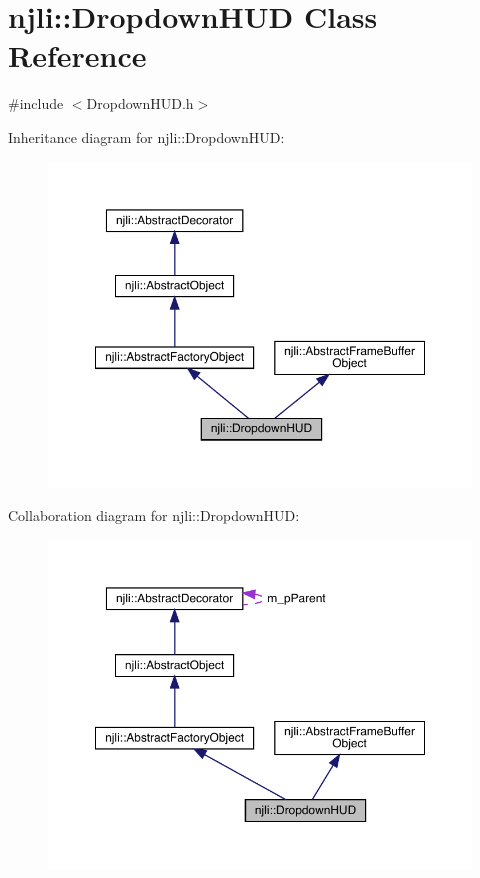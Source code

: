 \hypertarget{classnjli_1_1_dropdown_h_u_d}{}\section{njli\+:\+:Dropdown\+H\+UD Class Reference}
\label{classnjli_1_1_dropdown_h_u_d}


{\ttfamily \#include $<$Dropdown\+H\+U\+D.\+h$>$}



Inheritance diagram for njli\+:\+:Dropdown\+H\+UD\+:\nopagebreak
\begin{figure}[H]
\begin{center}
\leavevmode
\includegraphics[width=350pt]{classnjli_1_1_dropdown_h_u_d__inherit__graph}
\end{center}
\end{figure}


Collaboration diagram for njli\+:\+:Dropdown\+H\+UD\+:\nopagebreak
\begin{figure}[H]
\begin{center}
\leavevmode
\includegraphics[width=350pt]{classnjli_1_1_dropdown_h_u_d__coll__graph}
\end{center}
\end{figure}
